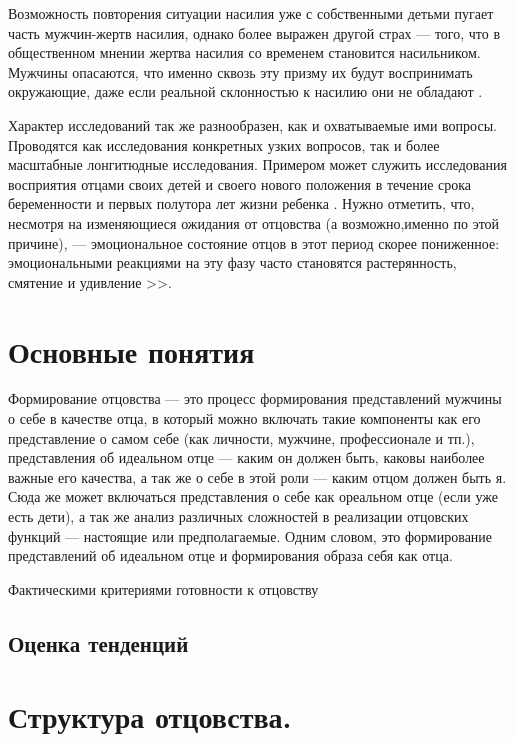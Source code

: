 \documentclass{../../common/thesisbyxetex}
\begin{document}
Возможность повторения ситуации насилия уже с собственными детьми пугает часть мужчин-жертв 
насилия, однако более выражен другой страх --- того, что в общественном мнении жертва насилия 
со временем становится насильником. Мужчины опасаются, что именно сквозь эту призму их будут 
воспринимать окружающие, даже если реальной склонностью к насилию они не обладают \cite{sex}. 

Характер исследований так же разнообразен, как и охватываемые ими вопросы. Проводятся как 
исследования конкретных узких вопросов, так и более масштабные лонгитюдные исследования. Примером 
может служить исследования восприятия отцами своих детей и своего нового положения в течение срока 
беременности и первых полутора лет жизни ребенка \cite{percep}. Нужно отметить, что, несмотря на 
изменяющиеся ожидания от отцовства (а возможно,именно по этой причине), --- эмоциональное состояние 
отцов в этот период скорее пониженное: эмоциональными реакциями на эту фазу часто 
становятся растерянность, смятение и удивление \cite[12]{meta}>>.

\section{Основные понятия}

Формирование отцовства --- это процесс формирования представлений мужчины о себе в качестве отца, в 
который можно включать такие компоненты как его представление о самом себе (как личности, мужчине, 
профессионале и тп.), представления об идеальном отце --- каким он должен быть, каковы наиболее 
важные его качества, а так же о себе в этой роли --- каким отцом должен быть я. Сюда же может 
включаться представления о себе как ореальном отце (если уже есть дети), а так же анализ различных 
сложностей в реализации отцовских функций --- настоящие или предполагаемые. 
Одним словом, это формирование представлений об идеальном отце и формирования образа себя как отца.

Фактическими критериями готовности  к отцовству


\subsection{Оценка тенденций}






\section{Структура отцовства.}
\end{document}
